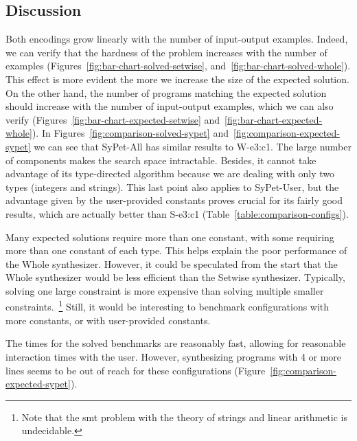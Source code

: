\subsection{Discussion}
\label{sec:discussion}

Both encodings grow linearly with the number of input-output examples.
Indeed, we can verify that the hardness of the problem increases with the number
of examples (Figures~\ref{fig:bar-chart-solved-setwise},
and~\ref{fig:bar-chart-solved-whole}).
This effect is more evident the more we increase the size of the expected
solution.
On the other hand, the number of programs matching the expected solution should
increase with the number of input-output examples, which we can also verify
(Figures~\ref{fig:bar-chart-expected-setwise}
and~\ref{fig:bar-chart-expected-whole}).
In Figures~\ref{fig:comparison-solved-sypet}
and~\ref{fig:comparison-expected-sypet} we can see that SyPet-All has similar
results to W-e3:c1.
The large number of components makes the search space intractable.
Besides, it cannot take advantage of its type-directed algorithm because we are
dealing with only two types (integers and strings).
This last point also applies to SyPet-User, but the advantage given by the
user-provided constants proves crucial for its fairly good results, which are
actually better than S-e3:c1 (Table~\ref{table:comparison-configs}).

Many expected solutions require more than one constant, with some requiring more
than one constant of each type.
This helps explain the poor performance of the Whole synthesizer.
However, it could be speculated from the start that the Whole synthesizer would
be less efficient than the Setwise synthesizer.
Typically, solving one large constraint is more expensive than solving multiple
smaller constraints.~\footnote{Note that the \gls{smt} problem with the theory
of strings and linear arithmetic is undecidable.}
Still, it would be interesting to benchmark configurations with more
constants, or with user-provided constants.


The times for the solved benchmarks are reasonably fast, allowing for reasonable
interaction times with the user.
However, synthesizing programs with 4 or more lines seems to be out of reach for
these configurations (Figure~\ref{fig:comparison-expected-sypet}).
